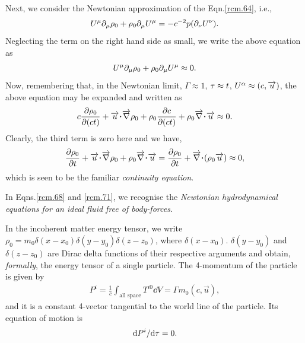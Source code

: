 Next, we consider the Newtonian approximation of  the 
Eqn.\break \eqref{rcm.64}, i.e.,
\begin{align*}
U^{{\mu}} {\partial}_{{\mu}} \rho_0  + \rho_0 {\partial}_{{\mu}} U^{{\mu}}
=-c^{-2}p({\partial}_{{\nu}} U^{{\nu}}).
\end{align*}
Neglecting the term on the right hand side as small,  we
write the above equation as
\begin{align}\label{rcm.69}
U^{{\mu}} {\partial}_{{\mu}} \rho_0  + \rho_0 {\partial}_{{\mu}} U^{{\mu}}
\approx 0.
\end{align}
Now, remembering that, in the Newtonian limit, $\Gamma 
\approx 1$,  ${\tau}\approx t$, $U^{{\alpha}}\approx (c, \overrightarrow{u})$, 
the above equation may be expanded and written as
\begin{align}\label{rcm.70}
c \frac{\dow \rho_0}{\dow (ct)}  +
\vec{u}\dotp\vnab\rho_0+\rho_0\frac{\dow c}{\dow
(ct)}+\rho_0\vnab\dotp \vec{u}\approx 0.
\end{align}
Clearly, the third term is zero here and we have,
\begin{align}\label{rcm.71}
\frac{\dow\rho_0}{\dow t} +
\vec{u}\dotp\vnab\rho_0+\rho_0\vnab\dotp
\vec{u}=\frac{\dow\rho_0}{\dow t} +  \vnab\dotp
(\rho_0\vec{u})\approx 0,
\end{align}
which is seen to be the familiar \textsl{continuity 
equation}.

In Eqns.\eqref{rcm.68} and \eqref{rcm.71}, we recognise the 
\textsl{Newtonian hydrodynamical equations for an ideal 
fluid free of  body-forces}.

 
\soln In the incoherent matter energy tensor, we write 
$\rho_0 =m_0 \delta(x-x_0) \delta(y-y_0) \delta(z-z_0)$, 
where $\delta(x-x_0)$. $\delta(y-y_0)$ and $\delta(z-z_0)$ 
are  Dirac delta functions of their respective arguments 
and 
obtain,  \textsl{formally},  the energy tensor of a single 
particle. The 4-momentum of the particle is given by
\begin{align}\label{rcm.126}
P^i=\frac{1}{c}\int_{\text{all space}}
T^{i0}\dd V =\Gamma m_0 (c,\vec{u}),
\end{align}
and it is a constant 4-vector tangential to the world line 
of the particle. Its equation of motion is
\begin{align} \label{rcm.127}
\mathrm{d} P^i/\mathrm{d} {\tau} =0.
\end{align}\ebxns
